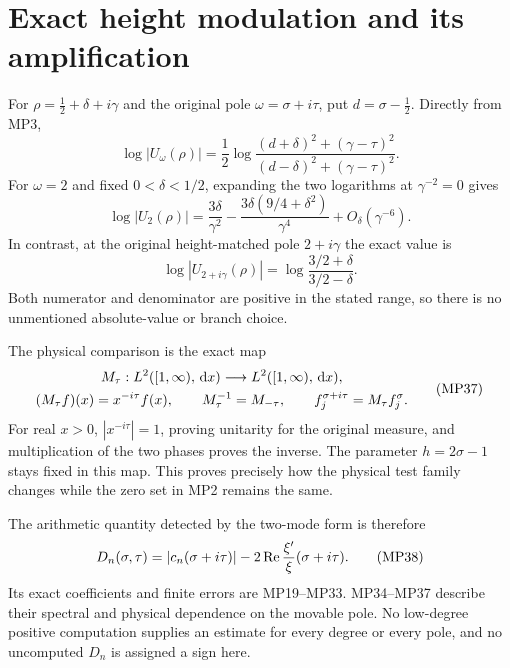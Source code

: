 \section{Exact height modulation and its amplification}
For $\rho=\tfrac12+\delta+i\gamma$ and the original pole
$\omega=\sigma+i\tau$, put $d=\sigma-\tfrac12$. Directly from MP3,
\begin{equation}
 \log|U_\omega(\rho)|
 =\frac12\log\frac{(d+\delta)^2+(\gamma-\tau)^2}
                         {(d-\delta)^2+(\gamma-\tau)^2}.
 \tag{MP34}
\end{equation}
For $\omega=2$ and fixed $0<\delta<1/2$, expanding the two logarithms
at $\gamma^{-2}=0$ gives
\begin{equation}
 \log|U_2(\rho)|
 =\frac{3\delta}{\gamma^2}
   -\frac{3\delta(9/4+\delta^2)}{\gamma^4}
   +O_\delta(\gamma^{-6}).\tag{MP35}
\end{equation}
In contrast, at the original height-matched pole $2+i\gamma$ the exact
value is
\begin{equation}
 \log|U_{2+i\gamma}(\rho)|
       =\log\frac{3/2+\delta}{3/2-\delta}.
 \tag{MP36}
\end{equation}
Both numerator and denominator are positive in the stated range, so
there is no unmentioned absolute-value or branch choice.

The physical comparison is the exact map
\begin{equation}
 \begin{gathered}
 M_\tau:L^2([1,\infty),\,\mathrm d x)\longrightarrow L^2([1,\infty),\,\mathrm d x),
 \\ (M_\tau f)(x)=x^{-i\tau}f(x),
 \qquad M_\tau^{-1}=M_{-\tau},\qquad
 f_j^{\sigma+i\tau}=M_\tau f_j^\sigma.
 \end{gathered}
 \tag{MP37}
\end{equation}
For real $x>0$, $|x^{-i\tau}|=1$, proving unitarity for the original
measure, and multiplication of the two phases proves the inverse.
The parameter $h=2\sigma-1$ stays fixed in this map. This proves precisely
how the physical test family changes while the zero set in MP2 remains
the same.

The arithmetic quantity detected by the two-mode form is therefore
\begin{equation}
 D_n(\sigma,\tau)=|c_n(\sigma+i\tau)|-
            2\operatorname{Re}\frac{\xi'}{\xi}(\sigma+i\tau).
 \tag{MP38}
\end{equation}
Its exact coefficients and finite errors are MP19--MP33. MP34--MP37
describe their spectral and physical dependence on the movable pole.
No low-degree positive computation supplies an estimate for every
degree or every pole, and no uncomputed $D_n$ is assigned a sign here.

